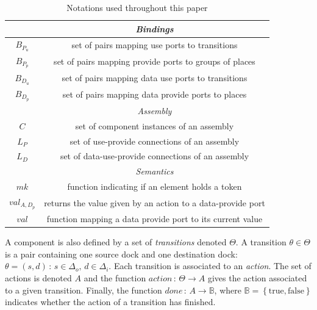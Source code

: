{\begin{table}[tp]
{\begin{tabular}{|c|c|}
      \hline
      \hline
      & \emph{Bindings}\\
      \hline
      $B_{P_{u}}$ & set of pairs mapping use ports to transitions\\
      $B_{P_{p}}$ & set of pairs mapping provide ports to groups of places\\
      $B_{D_{u}}$ & set of pairs mapping data use ports to transitions\\
      $B_{D_{p}}$ & set of pairs mapping data provide ports to places\\
      \hline
      \hline
      & \emph{Assembly}\\
      \hline
      $C$ & set of component instances of an assembly\\
      $L_{P}$ & set of use-provide connections of an assembly\\
      $L_{D}$ & set of data-use-provide connections of an assembly\\
      \hline
      \hline
      & \emph{Semantics}\\
      \hline
      $mk$ & function indicating if an element holds a token\\
      $val_{A,D_p}$ & returns the value given by an action to a data-provide port\\
      $val$ & function mapping a data provide port to its current value\\
      \hline
    \end{tabular}
  }
  \caption{Notations used throughout this paper}
  \label{tab:not}
\end{table}
A component is also defined by a set of \emph{transitions} denoted
$\Theta$. A transition $\theta \in \Theta$ is a pair containing one
source dock and one destination dock: $\theta =
\left(s,d\right)\,:\,s\in\Delta_{o},\,d\in\Delta_{i}$. 
%
Each transition is associated to an \emph{action}. The set of actions is
denoted $A$ and the function $action\,:\,\Theta\rightarrow A$ gives the action
associated to a given transition. Finally, the function
$done\,:\,A\rightarrow\mathbb{B}$, where $\mathbb{B}=\left\{
\text{true},\text{false}\right\}$ indicates whether the action of a
transition has finished.
  
}

